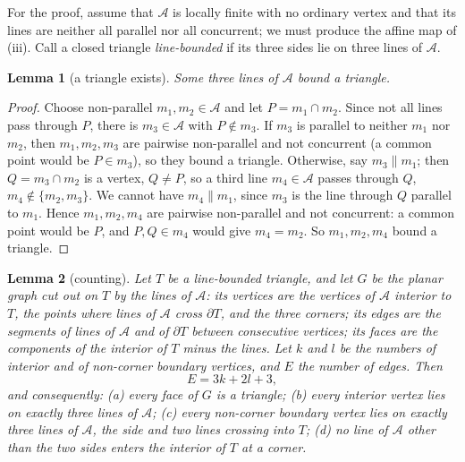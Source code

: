 \documentclass{article}
\newtheorem{lemma}{Lemma}
\begin{document}
	For the proof, assume that $\mathcal A$ is locally finite with no ordinary vertex and that its lines are neither all parallel nor all concurrent; we must produce the affine map of (iii). Call a closed triangle \emph{line-bounded} if its three sides lie on three lines of $\mathcal A$.

	\begin{lemma}[a triangle exists]\label{Lextri}
		Some three lines of $\mathcal A$ bound a triangle.
	\end{lemma}

	\begin{proof}
		Choose non-parallel $m_1,m_2\in\mathcal A$ and let $P=m_1\cap m_2$. Since not all lines pass through $P$, there is $m_3\in\mathcal A$ with $P\notin m_3$. If $m_3$ is parallel to neither $m_1$ nor $m_2$, then $m_1,m_2,m_3$ are pairwise non-parallel and not concurrent (a common point would be $P\in m_3$), so they bound a triangle. Otherwise, say $m_3\parallel m_1$; then $Q=m_3\cap m_2$ is a vertex, $Q\neq P$, so a third line $m_4\in\mathcal A$ passes through $Q$, $m_4\notin\{m_2,m_3\}$. We cannot have $m_4\parallel m_1$, since $m_3$ is the line through $Q$ parallel to $m_1$. Hence $m_1,m_2,m_4$ are pairwise non-parallel and not concurrent: a common point would be $P$, and $P,Q\in m_4$ would give $m_4=m_2$. So $m_1,m_2,m_4$ bound a triangle.
	\end{proof}

	\begin{lemma}[counting]\label{Lcount}
		Let $T$ be a line-bounded triangle, and let $G$ be the planar graph cut out on $T$ by the lines of $\mathcal A$: its vertices are the vertices of $\mathcal A$ interior to $T$, the points where lines of $\mathcal A$ cross $\partial T$, and the three corners; its edges are the segments of lines of $\mathcal A$ and of $\partial T$ between consecutive vertices; its faces are the components of the interior of $T$ minus the lines. Let $k$ and $l$ be the numbers of interior and of non-corner boundary vertices, and $E$ the number of edges. Then
		$$E=3k+2l+3,$$
		and consequently: \emph{(a)} every face of $G$ is a triangle; \emph{(b)} every interior vertex lies on exactly three lines of $\mathcal A$; \emph{(c)} every non-corner boundary vertex lies on exactly three lines of $\mathcal A$, the side and two lines crossing into $T$; \emph{(d)} no line of $\mathcal A$ other than the two sides enters the interior of $T$ at a corner.
	\end{lemma}
\end{document}
